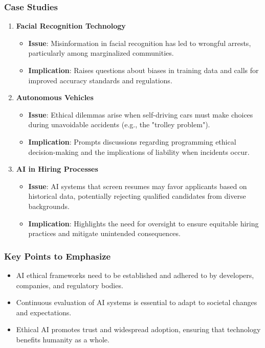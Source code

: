 \documentclass{beamer}
\begin{document}
\begin{frame}[fragile]
    \frametitle{Case Studies}
    \begin{enumerate}
        \item \textbf{Facial Recognition Technology}
            \begin{itemize}
                \item \textbf{Issue}: Misinformation in facial recognition has led to wrongful arrests, particularly among marginalized communities.
                \item \textbf{Implication}: Raises questions about biases in training data and calls for improved accuracy standards and regulations.
            \end{itemize}

        \item \textbf{Autonomous Vehicles}
            \begin{itemize}
                \item \textbf{Issue}: Ethical dilemmas arise when self-driving cars must make choices during unavoidable accidents (e.g., the "trolley problem").
                \item \textbf{Implication}: Prompts discussions regarding programming ethical decision-making and the implications of liability when incidents occur.
            \end{itemize}

        \item \textbf{AI in Hiring Processes}
            \begin{itemize}
                \item \textbf{Issue}: AI systems that screen resumes may favor applicants based on historical data, potentially rejecting qualified candidates from diverse backgrounds.
                \item \textbf{Implication}: Highlights the need for oversight to ensure equitable hiring practices and mitigate unintended consequences.
            \end{itemize}
    \end{enumerate}
\end{frame}

\begin{frame}[fragile]
    \frametitle{Key Points to Emphasize}
    \begin{itemize}
        \item AI ethical frameworks need to be established and adhered to by developers, companies, and regulatory bodies.
        \item Continuous evaluation of AI systems is essential to adapt to societal changes and expectations.
        \item Ethical AI promotes trust and widespread adoption, ensuring that technology benefits humanity as a whole.
    \end{itemize}
\end{frame}
\end{document}
